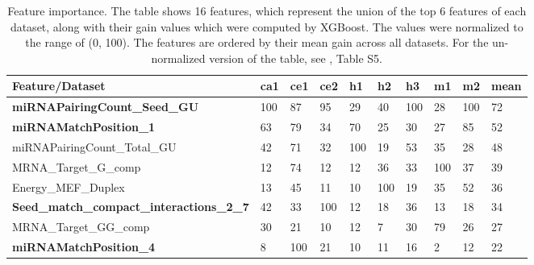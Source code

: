 \documentclass{bmcart}
\begin{document}
\begin{table}[h!]
\caption{Feature importance. The table shows 16 features, which represent the union of the top 6 features of each dataset, along with their gain values which were computed by XGBoost. The values were normalized to the range of (0, 100). The features are ordered by their mean gain across all datasets. For the un-normalized version of the table, see , Table S5.}
\label{tab:feature_importance}
\begin{tabular}{|l|l|l|l|l|l|l|l|l|l|}
\hline
\textbf{Feature/Dataset}                          & \textbf{ca1} & \textbf{ce1} & \textbf{ce2} & \textbf{h1} & \textbf{h2} & \textbf{h3} & \textbf{m1} & \textbf{m2} & \textbf{mean} \\ \hline
\textbf{miRNAPairingCount\_Seed\_GU}              & 100          & 87           & 95           & 29          & 40          & 100         & 28          & 100         & 72            \\ \hline
\textbf{miRNAMatchPosition\_1}                    & 63           & 79           & 34           & 70          & 25          & 30          & 27          & 85          & 52            \\ \hline
miRNAPairingCount\_Total\_GU                      & 42           & 71           & 32           & 100         & 19          & 53          & 35          & 28          & 48            \\ \hline
MRNA\_Target\_G\_comp                             & 12           & 74           & 12           & 12          & 36          & 33          & 100         & 37          & 39            \\ \hline
Energy\_MEF\_Duplex                               & 13           & 45           & 11           & 10          & 100         & 19          & 35          & 52          & 36            \\ \hline
\textbf{Seed\_match\_compact\_interactions\_2\_7} & 42           & 33           & 100          & 12          & 18          & 36          & 13          & 18          & 34            \\ \hline
MRNA\_Target\_GG\_comp                            & 30           & 21           & 10           & 12          & 7           & 30          & 79          & 26          & 27            \\ \hline
\textbf{miRNAMatchPosition\_4}                    & 8            & 100          & 21           & 10          & 11          & 16          & 2           & 12          & 22            \\ \hline

\end{tabular}
\end{table}
\end{document}
